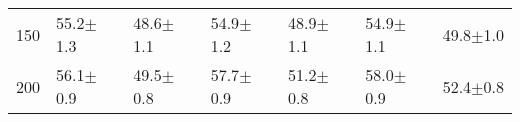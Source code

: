 \begin{tabular}{lllllll}
150 & {\cellcolor[HTML]{F0F0F0}} \color[HTML]{000000} 55.2$\pm$1.3 & {\cellcolor[HTML]{F1F1F1}} \color[HTML]{000000} 48.6$\pm$1.1 & {\cellcolor[HTML]{F3F3F3}} \color[HTML]{000000} 54.9$\pm$1.2 & {\cellcolor[HTML]{F2F2F2}} \color[HTML]{000000} 48.9$\pm$1.1 & {\cellcolor[HTML]{F3F3F3}} \color[HTML]{000000} 54.9$\pm$1.1 & {\cellcolor[HTML]{F3F3F3}} \color[HTML]{000000} 49.8$\pm$1.0 \\
200 & {\cellcolor[HTML]{F8F8F8}} \color[HTML]{000000} 56.1$\pm$0.9 & {\cellcolor[HTML]{F9F9F9}} \color[HTML]{000000} 49.5$\pm$0.8 & {\cellcolor[HTML]{FFFFFF}} \color[HTML]{000000} 57.7$\pm$0.9 & {\cellcolor[HTML]{FCFCFC}} \color[HTML]{000000} 51.2$\pm$0.8 & {\cellcolor[HTML]{FCFCFC}} \color[HTML]{000000} 58.0$\pm$0.9 & {\cellcolor[HTML]{FBFBFB}} \color[HTML]{000000} 52.4$\pm$0.8 \\
\end{tabular}

